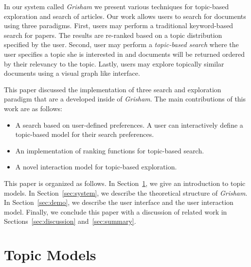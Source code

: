\documentclass[letterpaper]{article}
\newcommand{\cpg}[1]{{\textcolor{red}{#1 -- CPG}}}
\newcommand{\eat}[1]{}
\newcommand{\system}{\textsl{Grisham}\xspace}
\begin{document}
In our system called \system we present various techniques for topic-based exploration 
and search of articles. Our work allows users 
to search for documents using three paradigms. 
First, users may perform a traditional keyword-based search for papers.
The results are re-ranked based on a topic distribution specified by the user. 
Second, user may perform a \textsl{topic-based search} where the user specifies 
a topic she is interested in and documents will be returned ordered by their relevancy to the topic.
Lastly, users may explore topically similar documents using a visual 
graph like interface.


\eat{The main contributions of our work are the \textit{user-topic ranking function} 
which ranks the relevance of documents to a set of topics---\cpg{I 
think we need to edit this; a similar ranking function is there in 
\citeauthor{George2012}~\citeyear{George2012}}, the 
\textit{similar document explorations} which is performed by computing the 
similarity of papers to a topic of interest, and \textit{topic-document visualization} which 
ranks citations for a paper by the interest of the user.
}

This paper discussed the implementation of three search and exploration paradigm that are a developed inside of \system.
The main contributions of this work are as follows:
\begin{itemize}
\item A search based on user-defined preferences.
A user can interactively define a topic-based model for their search preferences.
\item An implementation of ranking functions for topic-based search.
\item A novel interaction model for topic-based exploration.
\end{itemize}

This paper is organized as follows.
In Section~\ref{sec:topicmodels}, we give an introduction to topic models.
In Section~\ref{sec:system}, we describe the theoretical structure of \system.
In Section~\ref{sec:demo}, we describe the user interface and the user interaction model.
Finally, we conclude this paper with a discussion of related work in Sections~\ref{sec:discussion} and~\ref{sec:summary}.




\section{Topic Models}
\label{sec:topicmodels}
\end{document}
